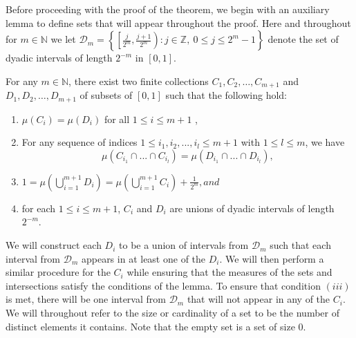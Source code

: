\documentclass[12pt]{article}
\begin{document}
Before proceeding with the proof of the theorem, we begin with an auxiliary lemma to define sets that will appear throughout the proof. Here and throughout for $m \in \mathbb{N}$ we let $\mathcal{D}_m = \left\{\left[\frac{j}{2^m}, \frac{j+1}{2^m}\right): j \in \mathbb{Z
}, ~ 0 \leq j \leq 2^m-1 \right\}$ denote the set of dyadic intervals of length $2^{-m}$ in $[0,1]$. 
\begin{lemma}\label{prelim equality lemma}
    For any $m \in \mathbb{N}$, there exist two finite collections  $C_1,\allowbreak C_2,\allowbreak \dots,\allowbreak C_{m+1}$ and
$D_1,\allowbreak D_2,\allowbreak \dots,\allowbreak D_{m+1}$ of subsets of $[0,1]$ such that the following hold: 
    \begin{enumerate}[label=(\roman*)]
    \item $\mu (C_i) = \mu (D_i) $ for all $1\leq i \leq m+1$ ,
     \item For any sequence of indices $1 \leq i_1,i_2,...,i_l \leq m+1$ with $1 \leq l \leq m$, we have \[\mu(C_{i_1} \cap ... \cap C_{i_l}) = \mu(D_{i_1} \cap ... \cap D_{i_l}),\]

     \item $1=\mu \left( \bigcup_{i=1}^{m+1} D_i \right) = \mu \left( \bigcup_{i=1}^{m+1} C_i \right)+\frac{1}{2^m}, and$     
     \item  for each $1 \leq i \leq m+1$, $C_i$ and $D_i$ are unions of dyadic intervals of length $2^{-m}$.
     \end{enumerate}


\end{lemma}

\begin{remark}
    We will construct each $D_i$ to be a union of intervals from $\mathcal{D}_m$ such that each interval from $\mathcal{D}_m$ appears in at least one of the $D_i$. We will then perform a similar procedure for the $C_i$ while ensuring that the measures of the sets and intersections satisfy the conditions of the lemma. To ensure that condition $(iii)$ is met, there will be one interval from $\mathcal{D}_m$ that will not appear in any of the $C_i$. We will throughout refer to the size or cardinality of a set to be the number of distinct elements it contains. Note that the empty set is a set of size 0.
\end{remark}
\end{document}
